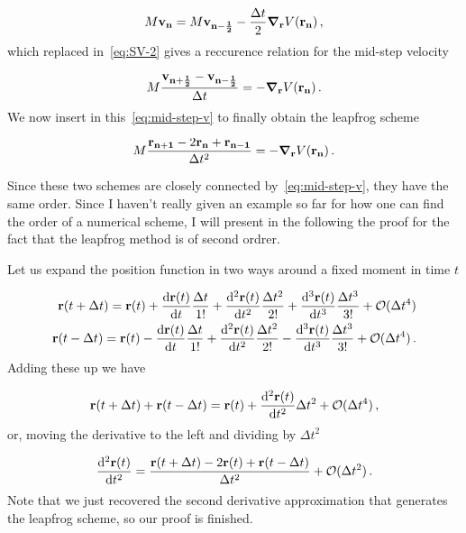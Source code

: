 \documentclass[12pt, class=report, crop=false]{standalone}
\begin{document}
\begin{equation}
  M\vb{v_{n}} = M\vb{v_{n-\frac{1}{2}}} - \frac{\Delta t}{2} \grad_{\vb{r}} V(\vb{r_{n}})\,,
\end{equation}
which replaced in~\cref{eq:SV-2} gives a reccurence relation for the mid-step velocity

\begin{equation}
  M\frac{\vb{v_{n+\frac{1}{2}}} - \vb{v_{n-\frac{1}{2}}}}{\Delta t} = - \grad_{\vb{r}} V(\vb{r_n})\,.
\end{equation}
We now insert in this~\cref{eq:mid-step-v} to finally obtain the leapfrog scheme

\begin{equation}
  M\frac{\vb{r_{n+1}} - 2\vb{r_n} + \vb{r_{n-1}}}{\Delta t^2} = - \grad_{\vb{r}} V(\vb{r_n})\,.
\end{equation}

Since these two schemes are closely connected by~\cref{eq:mid-step-v}, they have the same order. Since I haven't really given an example so far for how one can find the order of a numerical scheme, I will present in the following the proof for the fact that the leapfrog method is of second ordrer.

Let us expand the position function in two ways around a fixed moment in time \(t\)

\begin{subequations}
  \begin{align}
    \vb{r}(t+\Delta t) = \vb{r}(t)+ \dv{\vb{r}(t)}{t} \frac{\Delta t}{1!}+ \dv[2]{\vb{r}(t)}{t} \frac{\Delta t^2}{2!} + \dv[3]{\vb{r}(t)}{t} \frac{\Delta t^3}{3!}+ \mathcal{O}(\Delta t^4)\\
    \vb{r}(t-\Delta t) = \vb{r}(t)- \dv{\vb{r}(t)}{t} \frac{\Delta t}{1!}+ \dv[2]{\vb{r}(t)}{t} \frac{\Delta t^2}{2!} - \dv[3]{\vb{r}(t)}{t} \frac{\Delta t^3}{3!}+ \mathcal{O}(\Delta t^4)\,.
  \end{align}
\end{subequations}
Adding these up we have

\begin{equation}
  \vb{r}(t+\Delta t) + \vb{r}(t-\Delta t)= \vb{r}(t)+ \dv[2]{\vb{r}(t)}{t} \Delta t^2 + \mathcal{O}(\Delta t^4)\,,
\end{equation}
or, moving the derivative to the left and dividing by \(\Delta t^2\)

\begin{equation}
  \dv[2]{\vb{r}(t)}{t} = \frac{\vb{r}(t+\Delta t) - 2 \vb{r}(t) + \vb{r}(t-\Delta t)}{\Delta t^2} + \mathcal{O}(\Delta t^2)\,.
\end{equation}
Note that we just recovered the second derivative approximation that generates the leapfrog scheme, so our proof is finished.
\end{document}
